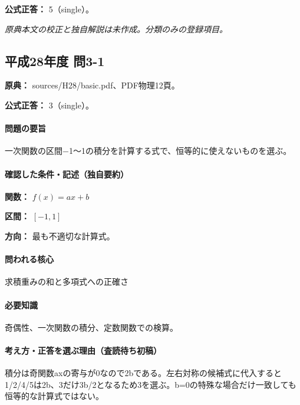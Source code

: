 \textbf{公式正答：} 5（single）。

\par\textit{原典本文の校正と独自解説は未作成。分類のみの登録項目。}

\subsection{平成28年度 問3-1}
\label{q:h28-reg-basic-3-1}

\noindent\textbf{原典：} sources/H28/basic.pdf、PDF物理12頁。

\textbf{公式正答：} 3（single）。

\paragraph{問題の要旨} 一次関数の区間−1〜1の積分を計算する式で、恒等的に使えないものを選ぶ。

\paragraph{確認した条件・記述（独自要約）}\mbox{}\par

\noindent\textbf{関数：} \(f(x)=ax+b\)\par

\noindent\textbf{区間：} \([-1,1]\)\par

\noindent\textbf{方向：} 最も不適切な計算式。\par

\paragraph{問われる核心} 求積重みの和と多項式への正確さ

\paragraph{必要知識} 奇偶性、一次関数の積分、定数関数での検算。

\paragraph{考え方・正答を選ぶ理由（査読待ち初稿）} 積分は奇関数axの寄与が0なので2bである。左右対称の候補式に代入すると1/2/4/5は2b、3だけ3b/2となるため3を選ぶ。b=\allowbreak{}0の特殊な場合だけ一致しても恒等的な計算式ではない。


